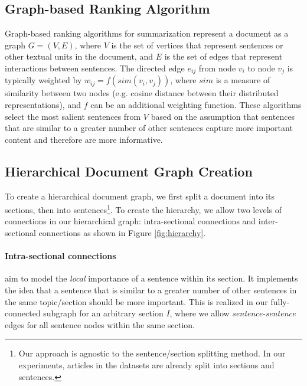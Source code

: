 \documentclass[11pt,a4paper]{article}
\begin{document}
\subsection{Graph-based Ranking Algorithm}
Graph-based ranking algorithms for summarization represent a document as a graph $G = (V, E)$, where $V$ is the set of vertices that represent sentences or other textual units in the document, and $E$ is the set of edges that represent interactions between sentences. The directed edge $e_{ij}$ from node $v_i$ to node $v_j$ is typically weighted by $w_{ij}=f(sim(v_i,v_j))$, where $sim$ is a measure of similarity between two nodes (e.g. cosine distance between their distributed representations), and $f$ can be an additional weighting function. These algorithms select the most salient sentences from $V$ based on the assumption that sentences that are similar to a greater number of other sentences capture more important content and therefore are more informative.

\subsection{Hierarchical Document Graph Creation}\label{sub-sec:method_hierarchy}
To create a hierarchical document graph, we first split a document into its sections, then into sentences\footnote{Our approach is agnostic to the sentence/section splitting method. In our experiments, articles in the datasets are already split into sections and sentences.}.  To create the hierarchy, we allow two levels of connections in our hierarchical graph: intra-sectional connections and inter-sectional connections as shown in Figure \ref{fig:hierarchy}.
\paragraph{Intra-sectional connections} aim to model the \textit{local} importance of a sentence within its section. It implements the idea that a sentence that is similar to a greater number of other sentences in the same topic/section should be more important. This is realized in our fully-connected subgraph for an arbitrary section $I$, where we allow  \textit{sentence-sentence} edges for all sentence nodes within the same section.
\end{document}
